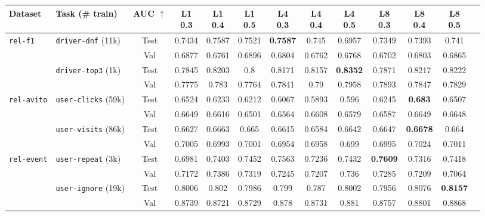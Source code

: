\documentclass{article} %
\begin{document}
\begin{table}[ht]
{\begin{tabular}{llccccccccccc}
\bottomrule
\toprule

\textbf{Dataset} & 
\textbf{Task (\# train)} & 
\textbf{AUC $\uparrow$} & 
\makecell{\textbf{L1}\\ \textbf{0.3}} & 
\makecell{\textbf{L1}\\ \textbf{0.4}} & 
\makecell{\textbf{L1}\\ \textbf{0.5}} & 
\makecell{\textbf{L4}\\ \textbf{0.3}} & 
\makecell{\textbf{L4}\\ \textbf{0.4}} & 
\makecell{\textbf{L4}\\ \textbf{0.5}} & 
\makecell{\textbf{L8}\\ \textbf{0.3}} & 
\makecell{\textbf{L8}\\ \textbf{0.4}} & 
\makecell{\textbf{L8}\\ \textbf{0.5}} 
\\
\midrule

\multirow{4}{*}{\texttt{rel-f1}} & \multirow{2}{*}{\texttt{driver-dnf} (11k)} & Test & 0.7434 & 0.7587 & 0.7521 & \textbf{0.7587} & 0.745 & 0.6957 & 0.7349 & 0.7393 & 0.741 \\ & & Val & 0.6877 & 0.6761 & 0.6896 & 0.6804 & 0.6762 & 0.6768 & 0.6702 & 0.6803 & 0.6865 \\ & \multirow{2}{*}{\texttt{driver-top3} (1k)} & Test & 0.7845 & 0.8203 & 0.8 & 0.8171 & 0.8157 & \textbf{0.8352} & 0.7871 & 0.8217 & 0.8222 \\ & & Val & 0.7775 & 0.783 & 0.7764 & 0.7841 & 0.79 & 0.7958 & 0.7893 & 0.7847 & 0.7829 \\

\midrule
\multirow{4}{*}{\texttt{rel-avito}} & \multirow{2}{*}{\texttt{user-clicks} (59k)} & Test & 0.6524 & 0.6233 & 0.6212 & 0.6067 & 0.5893 & 0.596 & 0.6245 & \textbf{0.683} & 0.6507 \\ & & Val & 0.6649 & 0.6616 & 0.6501 & 0.6564 & 0.6608 & 0.6579 & 0.6587 & 0.6649 & 0.6648 \\ & \multirow{2}{*}{\texttt{user-visits} (86k)} & Test & 0.6627 & 0.6663 & 0.665 & 0.6615 & 0.6584 & 0.6642 & 0.6647 & \textbf{0.6678} & 0.664 \\ & & Val & 0.7005 & 0.6993 & 0.7001 & 0.6954 & 0.6958 & 0.699 & 0.6995 & 0.7024 & 0.7011 \\

\midrule
\multirow{4}{*}{\texttt{rel-event}} & \multirow{2}{*}{\texttt{user-repeat} (3k)} & Test & 0.6981 & 0.7403 & 0.7452 & 0.7563 & 0.7236 & 0.7432 & \textbf{0.7609} & 0.7316 & 0.7418 \\ & & Val & 0.7172 & 0.7386 & 0.7319 & 0.7245 & 0.7207 & 0.736 & 0.7285 & 0.7209 & 0.7064 \\ & \multirow{2}{*}{\texttt{user-ignore} (19k)} & Test & 0.8006 & 0.802 & 0.7986 & 0.799 & 0.787 & 0.8002 & 0.7956 & 0.8076 & \textbf{0.8157} \\ & & Val & 0.8739 & 0.8721 & 0.8729 & 0.878 & 0.8731 & 0.881 & 0.8757 & 0.8801 & 0.8868 \\


\end{tabular}}
\end{table}
\end{document}
